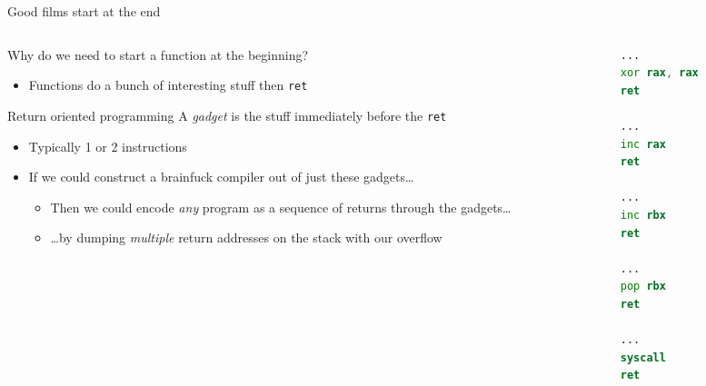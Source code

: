 \documentclass[9pt,aspectratio=169]{beamer}
\begin{document}
\begin{frame}[label={sec:org0c68c9f},fragile]{Good films start at the end}
 \begin{columns}
\begin{column}[t]{0.49\columnwidth}
Why do we need to start a function at the beginning?
\begin{itemize}
\item Functions do a bunch of interesting stuff then \texttt{ret}
\end{itemize}
\begin{block}{Return oriented programming}
A \emph{gadget} is the stuff immediately before the \texttt{ret}
\begin{itemize}
\item Typically 1 or 2 instructions
\item If we could construct a brainfuck compiler out of just these gadgets\ldots{}
\begin{itemize}
\item Then we could encode \emph{any} program as a sequence of returns through the gadgets\ldots{}
\item \ldots{}by dumping \emph{multiple} return addresses on the stack with our overflow
\end{itemize}
\end{itemize}
\end{block}
\end{column}
\begin{column}[t]{0.49\columnwidth}
\begin{lstlisting}[language=asm,numbers=none]
...
xor rax, rax
ret

...
inc rax
ret

...
inc rbx
ret

...
pop rbx
ret

...
syscall
ret
\end{lstlisting}
\end{column}
\end{columns}
\end{frame}
\end{document}
